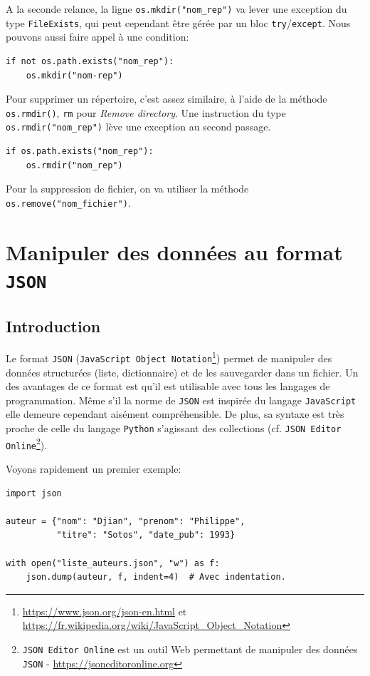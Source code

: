 \documentclass[a4paper,11pt]{book}
\begin{document}
A la seconde relance, la ligne \verb|os.mkdir("nom_rep")| va lever une exception du type \texttt{FileExists}, qui peut cependant être gérée par un bloc \texttt{try}/\texttt{except}. Nous pouvons aussi faire appel à une condition:
\begin{lstlisting}
if not os.path.exists("nom_rep"):
    os.mkdir("nom-rep")
\end{lstlisting}
\medskip

Pour supprimer un répertoire, c'est assez similaire, à l'aide de la méthode \texttt{os.rmdir()}, \texttt{rm} pour \textit{Remove directory}. Une instruction du type \verb|os.rmdir("nom_rep")| lève une exception  au second passage.
\begin{lstlisting}
if os.path.exists("nom_rep"):
    os.rmdir("nom_rep")
\end{lstlisting}
\medskip

Pour la suppression de fichier, on va utiliser la méthode \verb|os.remove("nom_fichier")|.
\medskip

\chapter{Manipuler des données au format \texttt{JSON}}
\section{Introduction}
Le format \texttt{JSON} (\texttt{JavaScript Object Notation}\footnote{\url{https://www.json.org/json-en.html} et \url{https://fr.wikipedia.org/wiki/JavaScript_Object_Notation}}) permet de manipuler des données structurées (liste, dictionnaire) et de les sauvegarder dans un fichier. Un des avantages de ce format est qu'il est utilisable avec tous les langages de programmation. Même s'il la norme de \texttt{JSON} est inspirée du langage \texttt{JavaScript} elle demeure cependant aisément compréhensible. De plus, sa syntaxe est très proche de celle du langage \texttt{Python} s'agissant des collections (cf. \texttt{JSON Editor Online}\footnote{\texttt{JSON Editor Online} est un outil Web permettant de manipuler des données \texttt{JSON} - \url{https://jsoneditoronline.org}}).
\medskip

Voyons rapidement un premier exemple:
\begin{lstlisting}[caption=Créer un fichier \texttt{.json}]
import json

auteur = {"nom": "Djian", "prenom": "Philippe",
          "titre": "Sotos", "date_pub": 1993}

with open("liste_auteurs.json", "w") as f:
    json.dump(auteur, f, indent=4)  # Avec indentation.
\end{lstlisting}\label{serialistionJSON}
\medskip
\end{document}
